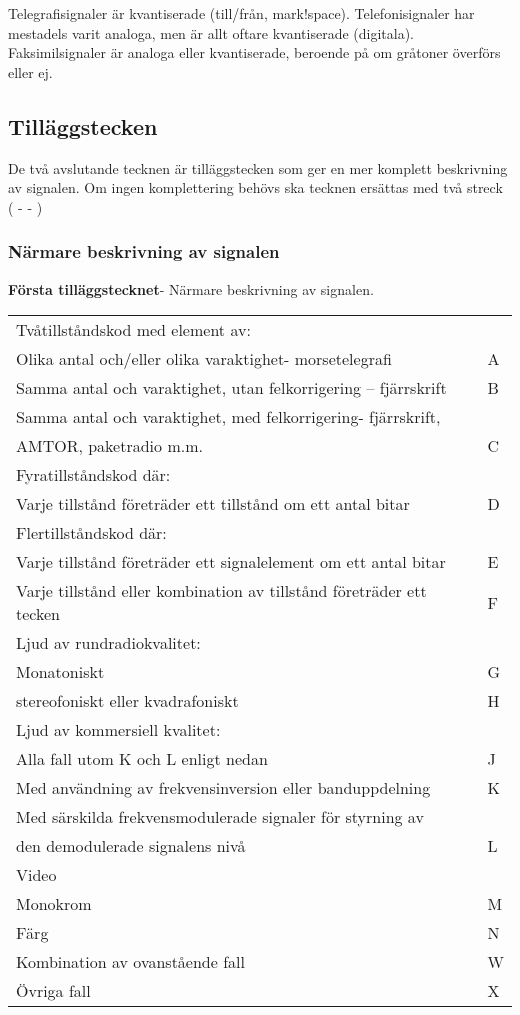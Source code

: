 Telegrafisignaler är kvantiserade (till/från, mark!space).
Telefonisignaler har mestadels varit analoga, men är allt oftare
kvantiserade (digitala). Faksimilsignaler är analoga eller kvantiserade,
beroende på om gråtoner överförs eller ej.


\subsection{Tilläggstecken}
De två avslutande tecknen är tilläggstecken som ger en mer komplett
beskrivning av signalen. Om ingen komplettering behövs ska tecknen ersättas med
två streck ( - - )

\subsubsection{Närmare beskrivning av signalen}
\textbf{Första tilläggstecknet}- Närmare beskrivning av signalen.\\
\begin{tabular}{ll}
	Tvåtillståndskod med element av: &\\
	Olika antal och/eller olika varaktighet- morsetelegrafi & A\\
	Samma antal och varaktighet, utan felkorrigering -- fjärrskrift & B\\
	Samma antal och varaktighet, med felkorrigering- fjärrskrift, &\\
	AMTOR, paketradio m.m. & C\\
	Fyratillståndskod där: &\\
	Varje tillstånd företräder ett tillstånd om ett antal bitar & D\\
	Flertillståndskod där: &\\
	Varje tillstånd företräder ett signalelement om ett antal bitar & E\\
	Varje tillstånd eller kombination av tillstånd företräder ett tecken & F\\
	Ljud av rundradiokvalitet: & \\
	Monatoniskt & G\\
	stereofoniskt eller kvadrafoniskt & H\\
	Ljud av kommersiell kvalitet: &\\
	Alla fall utom K och L enligt nedan & J\\
	Med användning av frekvensinversion eller banduppdelning & K\\
	Med särskilda frekvensmodulerade signaler för styrning av &\\
	den demodulerade signalens nivå & L\\
	Video &\\
	Monokrom & M\\
	Färg & N\\
	Kombination av ovanstående fall & W\\
	Övriga fall & X\\
\end{tabular}

